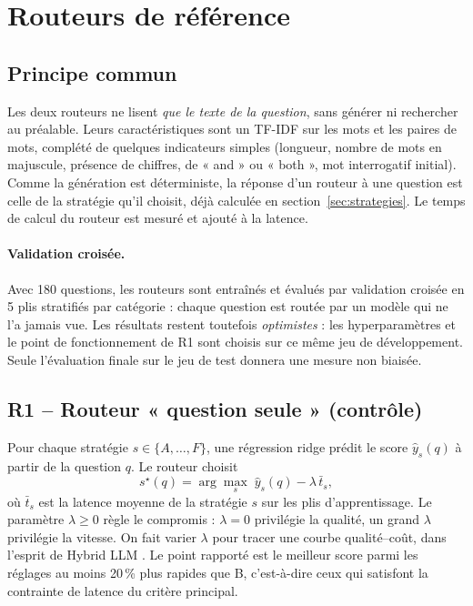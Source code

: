 \documentclass[11pt,a4paper]{article}
\begin{document}
\section{Routeurs de référence}\label{sec:routeurs}

\subsection{Principe commun}
Les deux routeurs ne lisent \emph{que le texte de la question}, sans générer ni rechercher au préalable.
Leurs caractéristiques sont un TF-IDF sur les mots et les paires de mots, complété de quelques
indicateurs simples (longueur, nombre de mots en majuscule, présence de chiffres, de « and » ou
« both », mot interrogatif initial). Comme la génération est déterministe, la réponse d'un routeur à une
question est celle de la stratégie qu'il choisit, déjà calculée en section~\ref{sec:strategies}. Le temps
de calcul du routeur est mesuré et ajouté à la latence.

\paragraph{Validation croisée.} Avec 180 questions, les routeurs sont entraînés et évalués par
validation croisée en 5 plis stratifiés par catégorie : chaque question est routée par un modèle qui ne
l'a jamais vue. Les résultats restent toutefois \emph{optimistes} : les hyperparamètres et le point de
fonctionnement de R1 sont choisis sur ce même jeu de développement. Seule l'évaluation finale sur le jeu
de test donnera une mesure non biaisée.

\subsection{R1 -- Routeur « question seule » (contrôle)}
Pour chaque stratégie $s \in \{A,\dots,F\}$, une régression ridge prédit le score $\hat{y}_s(q)$ à
partir de la question $q$. Le routeur choisit
\[
s^\star(q) = \arg\max_s \; \hat{y}_s(q) - \lambda \, \bar{t}_s ,
\]
où $\bar{t}_s$ est la latence moyenne de la stratégie $s$ sur les plis d'apprentissage. Le paramètre
$\lambda \geq 0$ règle le compromis : $\lambda = 0$ privilégie la qualité, un grand $\lambda$ privilégie
la vitesse. On fait varier $\lambda$ pour tracer une courbe qualité--coût, dans l'esprit de Hybrid LLM
\citep{ding2024hybrid}. Le point rapporté est le meilleur score parmi les réglages au moins 20\,\% plus
rapides que B, c'est-à-dire ceux qui satisfont la contrainte de latence du critère principal.
\end{document}
